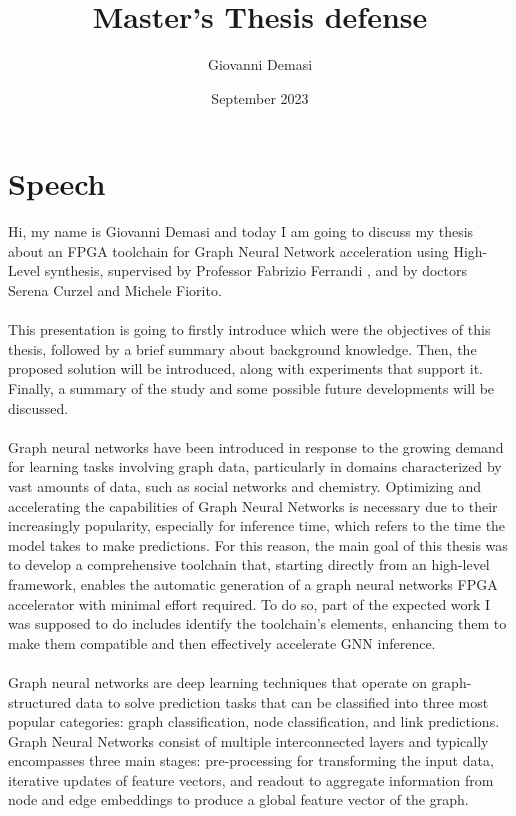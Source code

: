 \documentclass{article}
\title{\textbf{Master's Thesis defense}}
\author{Giovanni Demasi}
\date{September 2023}
\begin{document}
\maketitle

\section{Speech}

\noindent
Hi, my name is Giovanni Demasi and today I am going to discuss my thesis about an FPGA toolchain for Graph Neural Network acceleration using High-Level synthesis, supervised by Professor Fabrizio Ferrandi , and by doctors Serena Curzel and Michele Fiorito.
\\
\\
\noindent
This presentation is going to firstly introduce which were the objectives of this thesis, followed by a brief summary about background knowledge.
Then, the proposed solution will be introduced, along with experiments that support it.
Finally, a summary of the study and some possible future developments will be discussed.
\\
\\
\noindent
Graph neural networks have been introduced in response to the growing demand for learning tasks involving graph data, particularly in domains characterized by vast amounts of data, such as social networks and chemistry.
Optimizing and accelerating the capabilities of Graph Neural Networks is necessary due to their increasingly popularity, especially for inference time, which refers to the time the model takes to make predictions.
For this reason, the main goal of this thesis was to develop a comprehensive toolchain that, starting directly from an high-level framework, enables the automatic generation of a graph neural networks FPGA accelerator with minimal effort required.
To do so, part of the expected work I was supposed to do includes identify the toolchain's elements, enhancing them to make them compatible and then effectively accelerate GNN inference.
\\
\\
\noindent
Graph neural networks are deep learning techniques that operate on graph-structured data to solve prediction tasks that can be classified into three most popular categories: graph classification, node classification, and link predictions.
Graph Neural Networks consist of multiple interconnected layers and typically encompasses three main stages: pre-processing for transforming the input data, iterative updates of feature vectors, and readout to aggregate information from node and edge embeddings to produce a global feature vector of the graph.
\end{document}
